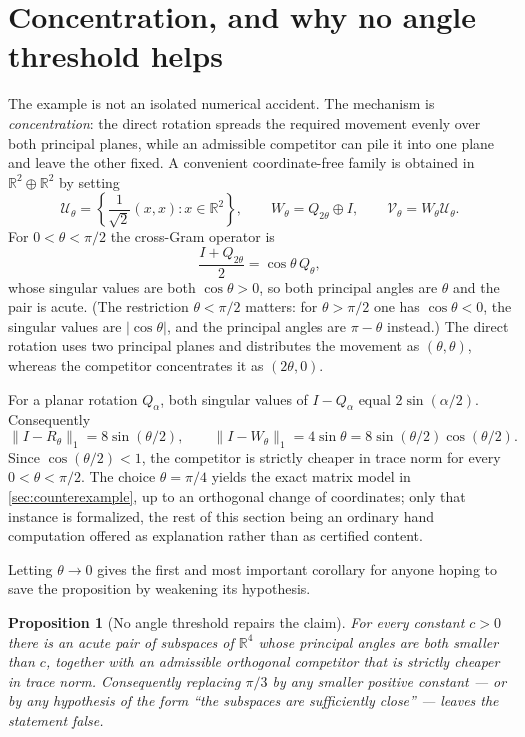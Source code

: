 \documentclass[11pt]{article}
\newtheorem{proposition}[theorem]{Proposition}
\theoremstyle{definition}
\newcommand{\R}{\mathbb R}
\newcommand{\trnorm}[1]{\lVert #1\rVert_1}
\begin{document}
\section{Concentration, and why no angle threshold helps}
\label{sec:family}

The example is not an isolated numerical accident.  The mechanism is
\emph{concentration}: the direct rotation spreads the required movement evenly
over both principal planes, while an admissible competitor can pile it into one
plane and leave the other fixed.  A convenient coordinate-free family is
obtained in
$\R^2\oplus\R^2$ by setting
\[
 \mathcal U_\theta
 =\left\{\frac1{\sqrt2}(x,x):x\in\R^2\right\},
 \qquad
 W_\theta=Q_{2\theta}\oplus I,
 \qquad
 \mathcal V_\theta=W_\theta\mathcal U_\theta.
\]
For $0<\theta<\pi/2$ the cross-Gram operator is
\[
 \frac{I+Q_{2\theta}}2=\cos\theta\,Q_\theta,
\]
whose singular values are both $\cos\theta>0$, so both principal angles are
$\theta$ and the pair is acute.  (The restriction $\theta<\pi/2$ matters: for
$\theta>\pi/2$ one has $\cos\theta<0$, the singular values are
$\lvert\cos\theta\rvert$, and the principal angles are $\pi-\theta$ instead.)
The direct rotation uses two principal planes and distributes the movement as
$(\theta,\theta)$, whereas the competitor concentrates it as $(2\theta,0)$.

For a planar rotation $Q_\alpha$, both singular values of $I-Q_\alpha$ equal
$2\sin(\alpha/2)$.  Consequently
\[
 \trnorm{I-R_\theta}=8\sin(\theta/2),
 \qquad
 \trnorm{I-W_\theta}=4\sin\theta
 =8\sin(\theta/2)\cos(\theta/2).
\]
Since $\cos(\theta/2)<1$, the competitor is strictly cheaper in trace norm for
every $0<\theta<\pi/2$.  The choice $\theta=\pi/4$ yields the exact matrix
model in \cref{sec:counterexample}, up to an orthogonal change of coordinates;
only that instance is formalized, the rest of this section being an ordinary
hand computation offered as explanation rather than as certified content.

Letting $\theta\to0$ gives the first and most important corollary for anyone
hoping to save the proposition by weakening its hypothesis.

\begin{proposition}[No angle threshold repairs the claim]
\label{prop:nothreshold}
For every constant $c>0$ there is an acute pair of subspaces of $\R^4$ whose
principal angles are both smaller than $c$, together with an admissible
orthogonal competitor that is strictly cheaper in trace norm.  Consequently
replacing $\pi/3$ by any smaller positive constant — or by any hypothesis of
the form ``the subspaces are sufficiently close'' — leaves the statement false.
\end{proposition}
\end{document}
